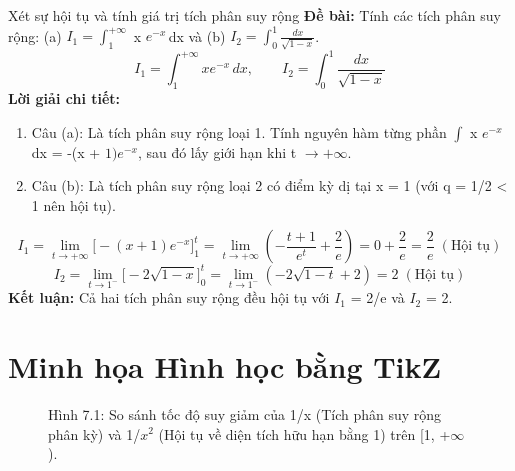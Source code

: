 \documentclass[11pt,a4paper,oneside]{book}
\begin{document}
\begin{vidu}{Xét sự hội tụ và tính giá trị tích phân suy rộng}
\textbf{Đề bài:} Tính các tích phân suy rộng: (a) $I_1 = \int_1^{+\infty}$ x $e^{-x}$\,dx và (b) $I_2 = \int_0^1 \frac{dx}{\sqrt{1 - x}}$.
\[ I_1 = \int_1^{+\infty} x e^{-x}\,dx, \qquad I_2 = \int_0^1 \frac{dx}{\sqrt{1 - x}} \]
\textbf{Lời giải chi tiết:}
\begin{enumerate}[leftmargin=1.5em, itemsep=2pt]
  \item Câu (a): Là tích phân suy rộng loại 1. Tính nguyên hàm từng phần $\int$ x $e^{-x}$ dx = -(x + $1)e^{-x}$, sau đó lấy giới hạn khi t $\to + \infty$.
  \item Câu (b): Là tích phân suy rộng loại 2 có điểm kỳ dị tại x = 1 (với q = 1/2 < 1 nên hội tụ).
\end{enumerate}
\[ I_1 = \lim_{t \to +\infty} \Big[ -(x + 1)e^{-x} \Big]_1^t = \lim_{t \to +\infty} \left( -\frac{t + 1}{e^t} + \frac{2}{e} \right) = 0 + \frac{2}{e} = \frac{2}{e} \;(\text{Hội tụ}) \]
\[ I_2 = \lim_{t \to 1^-} \Big[ -2\sqrt{1 - x} \Big]_0^t = \lim_{t \to 1^-} \left( -2\sqrt{1 - t} + 2 \right) = 2 \;(\text{Hội tụ}) \]
\noindent\textbf{Kết luận:} Cả hai tích phân suy rộng đều hội tụ với $I_1$ = 2/e và $I_2$ = 2.
\end{vidu}

\section{Minh họa Hình học bằng TikZ}
\begin{figure}[htbp]
\centering
{}
\caption{Hình 7.1: So sánh tốc độ suy giảm của 1/x (Tích phân suy rộng phân kỳ) và 1/$x^2$ (Hội tụ về diện tích hữu hạn bằng 1) trên [1, +$\infty$).}
\label{fig:tikz-ch7-parts}
\end{figure}
\end{document}
